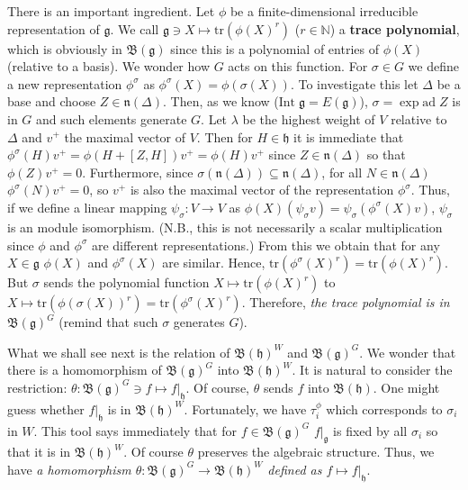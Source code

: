 \documentclass{article}
\newcommand{\NaN}{\mathbb{N}}
\newcommand{\tr}[1]{\mathrm{tr}#1}
\newcommand{\lie}[1]{\mathfrak{#1}}
\newcommand{\ad}[1]{\mathrm{ad}\; #1}
\begin{document}
There is an important ingredient.
Let $\phi$ be a finite-dimensional irreducible representation of $\lie{g}$.
We call $\lie{g} \ni X \mapsto \tr{(\phi(X)^r)}$ ($r \in \NaN$) a \textbf{trace polynomial}, which is obviously in $\mathfrak{B}(\lie{g})$ since this is a polynomial of entries of $\phi(X)$ (relative to a basis).
We wonder how $G$ acts on this function.
For $\sigma\in G$ we define a new representation $\phi^\sigma$ as $\phi^\sigma(X) = \phi(\sigma(X))$.
To investigate this let $\Delta$ be a base and choose $Z \in \lie{n}(\Delta)$.
Then, as we know ($\textrm{Int}\; \lie{g} = E(\lie{g})$), $\sigma = \exp{\ad{Z}}$ is in $G$ and such elements generate $G$.
Let $\lambda$ be the highest weight of $V$ relative to $\Delta$ and $v^+$ the maximal vector of $V$.
Then for $H \in \lie{h}$ it is immediate that $\phi^\sigma(H) v^+ = \phi(H + [Z, H]) v^+ = \phi(H)v^+$ since $Z \in \lie{n}(\Delta)$ so that $\phi(Z) v^+ = 0$.
Furthermore, since $\sigma(\lie{n}(\Delta)) \subseteq \lie{n}(\Delta)$, for all $N \in \lie{n}(\Delta)$ $\phi^\sigma(N) v^+ = 0$, so $v^+$ is also the maximal vector of the representation $\phi^\sigma$.
Thus, if we define a linear mapping $\psi_\sigma : V \to V$ as $\phi(X) (\psi_\sigma v) = \psi_\sigma(\phi^\sigma(X) v)$, $\psi_\sigma$ is an module isomorphism.
(N.B., this is not necessarily a scalar multiplication since $\phi$ and $\phi^\sigma$ are different representations.)
From this we obtain that for any $X \in \lie{g}$ $\phi(X)$ and $\phi^\sigma(X)$ are similar.
Hence, $\tr{(\phi^\sigma(X)^r)} = \tr{(\phi(X)^r)}$.
But $\sigma$ sends the polynomial function $X \mapsto \tr{(\phi(X)^r)}$ to $X \mapsto \tr{(\phi(\sigma(X))^r)} = \tr{(\phi^\sigma(X)^r)}$.
Therefore, \textit{the trace polynomial is in $\mathfrak{B}(\lie{g})^G$} (remind that such $\sigma$ generates $G$).

What we shall see next is the relation of $\mathfrak{B}(\lie{h})^W$ and $\mathfrak{B}(\lie{g})^G$.
We wonder that there is a homomorphism of $\mathfrak{B}(\lie{g})^G$ into $\mathfrak{B}(\lie{h})^W$.
It is natural to consider the restriction: $\theta : \mathfrak{B}(\lie{g})^G \ni f \mapsto f|_{\lie{h}}$.
Of course, $\theta$ sends $f$ into $\mathfrak{B}(\lie{h})$.
One might guess whether $f|_\lie{h}$ is in $\mathfrak{B}(\lie{h})^W$.
Fortunately, we have $\tau^\phi_i$ which corresponds to $\sigma_i$ in $W$.
This tool says immediately that for $f \in \mathfrak{B}(\lie{g})^G$ $f|_\lie{g}$ is fixed by all $\sigma_i$ so that it is in $\mathfrak{B}(\lie{h})^W$.
Of course $\theta$ preserves the algebraic structure.
Thus, we have \textit{a homomorphism $\theta : \mathfrak{B}(\lie{g})^G \to \mathfrak{B}(\lie{h})^W$ defined as $f \mapsto f|_\lie{h}$}.
\end{document}
